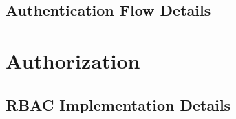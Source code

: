 \documentclass[a4paper,twoside]{sapthesis}
\begin{document}
\subsection{Authentication Flow Details}
%
%
%
%
%
%
%
%

\section{Authorization}
\label{sec:authorization}

\subsection{RBAC Implementation Details}
%
%
%
%
%
%
\end{document}
